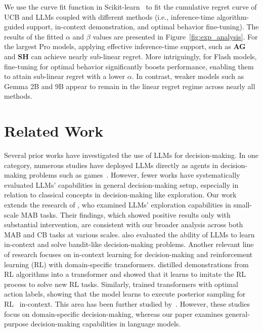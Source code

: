 \documentclass[11pt, logo]{googledeepmind}
\theoremstyle{plain}
\theoremstyle{definition}
\begin{document}
We use the curve fit function in Scikit-learn~\citep{pedregosa2011scikit} to fit the cumulative regret curve of UCB and LLMs coupled with different methods (i.e., inference-time algorithm-guided support, in-context demonstration, and optimal behavior fine-tuning).
The results of the fitted $\alpha$ and $\beta$ values are presented in Figure~\ref{fig:exp_analysis}.
For the largest Pro models, applying effective inference-time support, such as \textbf{AG} and \textbf{SH} can achieve nearly sub-linear regret. More intriguingly, for Flash models, fine-tuning for optimal behavior significantly boosts performance, enabling them to attain sub-linear regret with a lower $\alpha$. In contrast, weaker models such as Gemma 2B and 9B appear to remain in the linear regret regime across nearly all methods.
\section{Related Work}
Several prior works have investigated the use of LLMs for decision-making. In one category, numerous studies have deployed LLMs directly as agents in decision-making problems such as games~\citep{yao2023react,brooks2024large,shinn2024reflexion,wang2023voyager,xi2023rise}. However, fewer works have systematically evaluated LLMs' capabilities in general decision-making setup, especially in relation to classical concepts in decision-making like exploration. Our work extends the research of \citet{krishnamurthy2024can}, who examined LLMs' exploration capabilities in small-scale MAB tasks. Their findings, which showed positive results only with substantial intervention, are consistent with our broader analysis across both MAB and CB tasks at various scales. \citet{mirchandani2023large,rahn2024controlling,felicioni2024importance} also evaluated the ability of LLMs to learn in-context and solve bandit-like decision-making problems.
Another relevant line of research focuses on in-context learning for decision-making and reinforcement learning (RL) with domain-specific transformers. \citet{laskin2022context} distilled demonstrations from RL algorithms into a transformer and showed that it learns to imitate the RL process to solve new RL tasks. Similarly, \citet{lee2024supervised} trained transformers with optimal action labels, showing that the model learns to execute posterior sampling for RL~\citep{osband2013more} in-context. This area has been further studied by~\citet{raparthy2023generalization,lin2023transformers,bai2023transformers}. However, these studies focus on domain-specific decision-making, whereas our paper examines general-purpose decision-making capabilities in language models.
\end{document}
